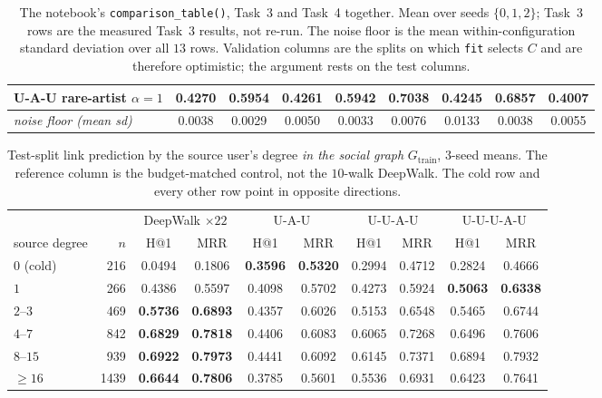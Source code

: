 \begin{table}[H]
\begin{tabular}{@{}lcccccccc@{}}
\textsf{U-A-U} rare-artist $\alpha{=}1$ & 0.4270 & 0.5954 & 0.4261 & 0.5942 & 0.7038 & 0.4245 & 0.6857 & 0.4007 \\
\midrule
\textit{noise floor (mean sd)} & 0.0038 & 0.0029 & 0.0050 & 0.0033 & 0.0076 & 0.0133 & 0.0038 & 0.0055 \\
\bottomrule
\end{tabular}
\caption{The notebook's \texttt{comparison\_table()}, Task~3 and Task~4 together.
Mean over seeds $\{0,1,2\}$; Task~3 rows are the measured Task~3 results, not re-run.
The noise floor is the mean within-configuration standard deviation over all $13$ rows.
Validation columns are the splits on which \texttt{fit} selects $C$ and are therefore
optimistic; the argument rests on the test columns.}
\label{p2:tab:main}
\end{table}

\begin{table}[H]
\centering\footnotesize
\setlength{\tabcolsep}{4.5pt}
\begin{tabular}{@{}lrcccccccc@{}}
\toprule
& & \multicolumn{2}{c}{DeepWalk $\times22$} & \multicolumn{2}{c}{\textsf{U-A-U}}
  & \multicolumn{2}{c}{\textsf{U-U-A-U}} & \multicolumn{2}{c}{\textsf{U-U-U-A-U}} \\
\cmidrule(lr){3-4}\cmidrule(lr){5-6}\cmidrule(lr){7-8}\cmidrule(lr){9-10}
source degree & $n$ & H@1 & MRR & H@1 & MRR & H@1 & MRR & H@1 & MRR \\
\midrule
$0$ (cold) & 216 & 0.0494 & 0.1806 & \textbf{0.3596} & \textbf{0.5320} & 0.2994 & 0.4712 & 0.2824 & 0.4666 \\
$1$ & 266 & 0.4386 & 0.5597 & 0.4098 & 0.5702 & 0.4273 & 0.5924 & \textbf{0.5063} & \textbf{0.6338} \\
$2$--$3$ & 469 & \textbf{0.5736} & \textbf{0.6893} & 0.4357 & 0.6026 & 0.5153 & 0.6548 & 0.5465 & 0.6744 \\
$4$--$7$ & 842 & \textbf{0.6829} & \textbf{0.7818} & 0.4406 & 0.6083 & 0.6065 & 0.7268 & 0.6496 & 0.7606 \\
$8$--$15$ & 939 & \textbf{0.6922} & \textbf{0.7973} & 0.4441 & 0.6092 & 0.6145 & 0.7371 & 0.6894 & 0.7932 \\
$\ge 16$ & 1439 & \textbf{0.6644} & \textbf{0.7806} & 0.3785 & 0.5601 & 0.5536 & 0.6931 & 0.6423 & 0.7641 \\
\bottomrule
\end{tabular}
\caption{Test-split link prediction by the source user's degree \emph{in the social graph}
$G_{\mathrm{train}}$, $3$-seed means.  The reference column is the budget-matched control,
not the $10$-walk DeepWalk.  The cold row and every other row point in opposite
directions.}
\label{p2:tab:degree}
\end{table}

